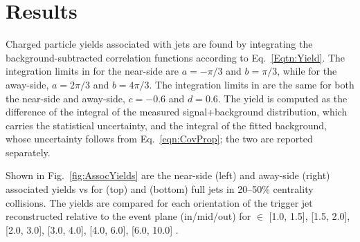 \section{Results} \label{sect:Results}
\label{sect:Yields}
Charged particle yields associated with jets are found by integrating the background-subtracted correlation functions according to Eq.~\ref{Eqtn:Yield}.
%
The integration limits in \dphi for the near-side are $a=-\pi/3$ and $b=\pi/3$, while for the away-side, $a=2\pi/3$ and  $b=4\pi/3$.  The integration limits in \deta are the same for both the near-side and away-side, $c=-0.6$ and $d=0.6$.
%
The yield is computed as the difference of the integral of the measured signal+background distribution, which carries the statistical uncertainty, and the integral of the fitted background, whose uncertainty follows from Eq.~\ref{eqn:CovProp}; the two are reported separately.

Shown in Fig.~\ref{fig:AssocYields} are the near-side (left) and away-side (right) associated yields vs  for  (top) and  (bottom) full jets in 20--50\% centrality collisions.  The yields are compared for each orientation of the trigger jet reconstructed relative to the event plane (in/mid/out) for  $\in$ [1.0, 1.5], [1.5, 2.0], [2.0, 3.0], [3.0, 4.0], [4.0, 6.0], [6.0, 10.0] \GeVc.

